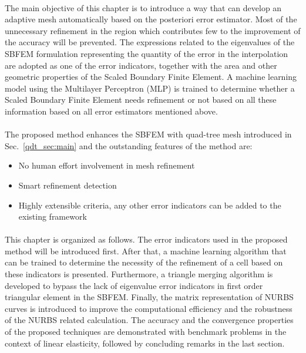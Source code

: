 \paragraph{}
The main objective of this chapter is to introduce a way that can develop an adaptive mesh automatically based on the posteriori error estimator.
Most of the unnecessary refinement in the region which contributes few to the improvement of the accuracy will be prevented.
The expressions related to the eigenvalues of the SBFEM formulation representing the quantity of the error in the interpolation are adopted as one of the error indicators, together with the area and other geometric properties of the Scaled Boundary Finite Element.
A machine learning model using the Multilayer Perceptron (MLP) is trained to determine whether a Scaled Boundary Finite Element needs refinement or not based on all these information based on all error estimators mentioned above.

\paragraph{}
The proposed method enhances the SBFEM with quad-tree mesh introduced in Sec.~\ref{qdt_sec:main} and the outstanding features of the method are:
\begin{itemize}
    \item No human effort involvement in mesh refinement
    \item Smart refinement detection
    \item Highly extensible criteria, any other error indicators can be added to the existing framework
\end{itemize}

\paragraph{}
This chapter is organized as follows.
The error indicators used in the proposed method will be introduced first.
After that, a machine learning algorithm that can be trained to determine the necessity of the refinement of a cell based on these indicators is presented.
Furthermore, a triangle merging algorithm is developed to bypass the lack of eigenvalue error indicators in first order triangular element in the SBFEM.
Finally, the matrix representation of NURBS curves is introduced to improve the computational efficiency and the robustness of the NURBS related calculation.
The accuracy and the convergence properties of the proposed techniques are demonstrated with benchmark problems in the context of linear elasticity, followed by concluding remarks in the last section.
